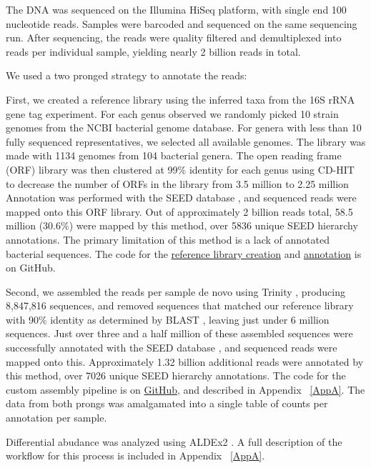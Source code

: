 The DNA was sequenced on the Illumina HiSeq platform, with single end 100 nucleotide reads. Samples were barcoded and sequenced on the same sequencing run. After sequencing, the reads were quality filtered and demultiplexed into reads per individual sample, yielding nearly 2 billion reads in total.

We used a two pronged strategy to annotate the reads:

First, we created a reference library using the inferred taxa from the 16S rRNA gene tag experiment. For each genus observed we randomly picked 10 strain genomes from the NCBI bacterial genome database. For genera with less than 10 fully sequenced representatives, we selected all available genomes. The library was made with 1134 genomes from 104 bacterial genera. The open reading frame (ORF) library was then clustered at 99\% identity for each genus using CD-HIT \cite{li2006cd} to decrease the number of ORFs in the library from 3.5 million to 2.25 million Annotation was performed with the SEED database \cite{overbeek2005subsystems}, and sequenced reads were mapped onto this ORF library. Out of approximately 2 billion reads total, 58.5 million (30.6\%) were mapped by this method, over 5836 unique SEED hierarchy annotations. The primary limitation of this method is a lack of annotated bacterial sequences. The code for the \href{https://github.com/ruthgrace/make_functional_mapping_library}{reference library creation} and \href{https://github.com/ruthgrace/mapping_library_annotated_counts}{annotation} is on GitHub.

Second, we assembled the reads per sample de novo using Trinity \cite{haas2013novo}, producing 8,847,816 sequences, and removed sequences that matched our reference library with 90\% identity as determined by BLAST \cite{altschul1990basic}, leaving just under 6 million sequences. Just over three and a half million of these assembled sequences were successfully annotated with the SEED database \cite{overbeek2005subsystems}, and sequenced reads were mapped onto this. Approximately 1.32 billion additional reads were annotated by this method, over 7026 unique SEED hierarchy annotations. The code for the custom assembly pipeline is on \href{https://github.com/ruthgrace/exploring_nafld_assembly}{GitHub}, and described in Appendix ~\ref{AppA}. The data from both prongs was amalgamated into a single table of counts per annotation per sample.

Differential abudance was analyzed using ALDEx2 \cite{fernandes2014unifying}. A full description of the workflow for this process is included in Appendix ~\ref{AppA}.

